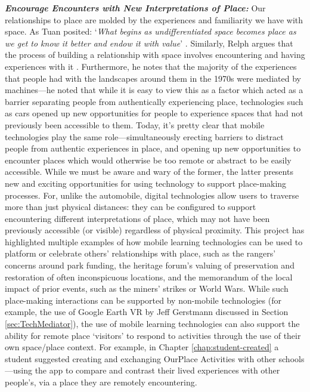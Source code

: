 \textbf{\textit{Encourage Encounters with New Interpretations of Place:}}  Our relationships to place are molded by the experiences and familiarity we have with space. As Tuan posited: `\textit{What begins as undifferentiated space becomes place as we get to know it better and endow it with value}' \citep{Tuan1978}. Similarly, Relph argues that the process of building a relationship with space involves encountering and having experiences with it \citep{Relph1976}. Furthermore, he notes that the majority of the experiences that people had with the landscapes around them in the 1970s were mediated by machines---he noted that while it is easy to view this as a factor which acted as a barrier separating people from authentically experiencing place, technologies such as cars opened up new opportunities for people to experience spaces that had not previously been accessible to them. Today, it's pretty clear that mobile technologies play the same role---simultaneously erecting barriers to distract people from authentic experiences in place, and opening up new opportunities to encounter places which would otherwise be too remote or abstract to be easily accessible. While we must be aware and wary of the former, the latter presents new and exciting opportunities for using technology to support place-making processes. For, unlike the automobile, digital technologies allow users to traverse more than just physical distances: they can be configured to support encountering different interpretations of place, which may not have been previously accessible (or visible) regardless of physical proximity. This project has highlighted multiple examples of how mobile learning technologies can be used to platform or celebrate others' relationships with place, such as the rangers' concerns around park funding, the heritage forum's valuing of preservation and restoration of often inconspicuous locations, and the memorandum of the local impact of prior events, such as the miners' strikes or World Wars. While such place-making interactions can be supported by non-mobile technologies (for example, the use of Google Earth VR by Jeff Gerstmann discussed in Section \ref{sec:TechMediator}), the use of mobile learning technologies can also support the ability for remote place `visitors' to respond to activities through the use of their own space/place context. For example, in Chapter \ref{chap:student-created} a student suggested creating and exchanging OurPlace Activities with other schools---using the app to compare and contrast their lived experiences with other people's, via a place they are remotely encountering. 

